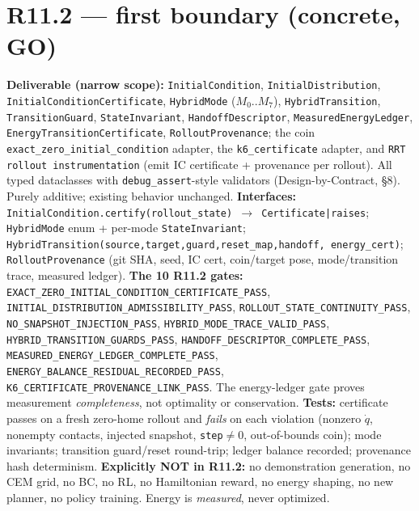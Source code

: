 \documentclass[11pt]{article}
\newcommand{\code}[1]{\texttt{\small #1}}
\newcommand{\gate}[1]{\textcolor{blue!55!black}{\texttt{\small #1}}}
\begin{document}
\section{R11.2 --- first boundary (concrete, GO)}
\textbf{Deliverable (narrow scope):} \code{InitialCondition}, \code{InitialDistribution},
\code{InitialConditionCertificate}, \code{HybridMode} ($M_0..M_7$), \code{HybridTransition}, \code{TransitionGuard},
\code{StateInvariant}, \code{HandoffDescriptor}, \code{MeasuredEnergyLedger}, \code{EnergyTransitionCertificate},
\code{RolloutProvenance}; the coin \code{exact\_zero\_initial\_condition} adapter, the \code{k6\_certificate} adapter, and
\code{RRT rollout instrumentation} (emit IC certificate + provenance per rollout). All typed dataclasses with
\code{debug\_assert}-style validators (Design-by-Contract, \S8). Purely additive; existing behavior unchanged.
\textbf{Interfaces:} \code{InitialCondition.certify(rollout\_state) $\to$ Certificate|raises};
\code{HybridMode} enum + per-mode \code{StateInvariant}; \code{HybridTransition(source,target,guard,reset\_map,handoff,
energy\_cert)}; \code{RolloutProvenance} (git SHA, seed, IC cert, coin/target pose, mode/transition trace, measured ledger).
\textbf{The 10 R11.2 gates:}
\gate{EXACT\_ZERO\_INITIAL\_CONDITION\_CERTIFICATE\_PASS},
\gate{INITIAL\_DISTRIBUTION\_ADMISSIBILITY\_PASS},
\gate{ROLLOUT\_STATE\_CONTINUITY\_PASS},
\gate{NO\_SNAPSHOT\_INJECTION\_PASS},
\gate{HYBRID\_MODE\_TRACE\_VALID\_PASS},
\gate{HYBRID\_TRANSITION\_GUARDS\_PASS},
\gate{HANDOFF\_DESCRIPTOR\_COMPLETE\_PASS},
\gate{MEASURED\_ENERGY\_LEDGER\_COMPLETE\_PASS},
\gate{ENERGY\_BALANCE\_RESIDUAL\_RECORDED\_PASS},
\gate{K6\_CERTIFICATE\_PROVENANCE\_LINK\_PASS}.
The energy-ledger gate proves measurement \emph{completeness}, not optimality or conservation.
\textbf{Tests:} certificate passes on a fresh zero-home rollout and \emph{fails} on each violation (nonzero $\dot q$,
nonempty contacts, injected snapshot, \code{step}$\neq0$, out-of-bounds coin); mode invariants; transition guard/reset
round-trip; ledger balance recorded; provenance hash determinism.
\textbf{Explicitly NOT in R11.2:} no demonstration generation, no CEM grid, no BC, no RL, no Hamiltonian reward, no energy
shaping, no new planner, no policy training. Energy is \emph{measured}, never optimized.
\end{document}
